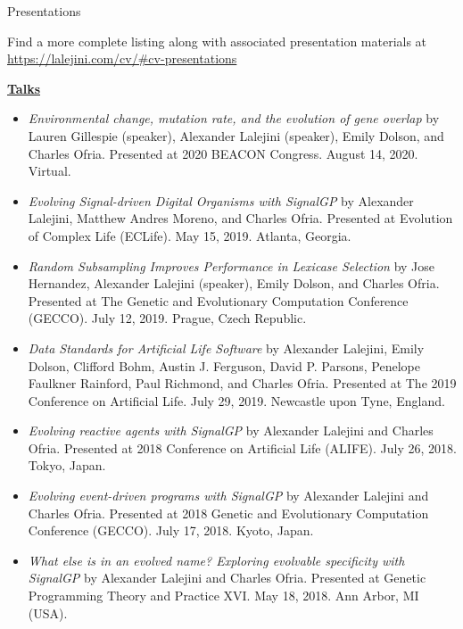 \begin{rSection}{Presentations}

Find a more complete listing along with associated presentation materials at \url{https://lalejini.com/cv/#cv-presentations}

\underline{\large {\bf Talks}}

\begin{itemize}

\item \textit{Environmental change, mutation rate, and the evolution of gene overlap}
by Lauren Gillespie (speaker), Alexander Lalejini (speaker), Emily Dolson, and Charles Ofria.
Presented at 2020 BEACON Congress. August 14, 2020. Virtual.

\item \textit{Evolving Signal-driven Digital Organisms with SignalGP}
by Alexander Lalejini, Matthew Andres Moreno, and Charles Ofria.
Presented at Evolution of Complex Life (ECLife). May 15, 2019. Atlanta, Georgia.

\item \textit{Random Subsampling Improves Performance in Lexicase Selection}
by Jose Hernandez, Alexander Lalejini (speaker), Emily Dolson, and Charles Ofria.
Presented at The Genetic and Evolutionary Computation Conference (GECCO). July 12, 2019. Prague, Czech Republic.

\item \textit{Data Standards for Artificial Life Software}
by Alexander Lalejini, Emily Dolson, Clifford Bohm, Austin J. Ferguson, David P. Parsons, Penelope Faulkner Rainford, Paul Richmond, and Charles Ofria.
Presented at The 2019 Conference on Artificial Life. July 29, 2019. Newcastle upon Tyne, England.

\item \textit{Evolving reactive agents with SignalGP}
by Alexander Lalejini and Charles Ofria.
Presented at 2018 Conference on Artificial Life (ALIFE). July 26, 2018. Tokyo, Japan.

\item \textit{Evolving event-driven programs with SignalGP}
by Alexander Lalejini and Charles Ofria.
Presented at 2018 Genetic and Evolutionary Computation Conference (GECCO). July 17, 2018. Kyoto, Japan.

\item \textit{What else is in an evolved name? Exploring evolvable specificity with SignalGP}
by Alexander Lalejini and Charles Ofria.
Presented at Genetic Programming Theory and Practice XVI. May 18, 2018. Ann Arbor, MI (USA).


\end{itemize}
\end{rSection}
